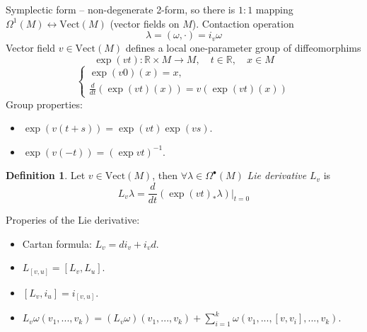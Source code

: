 \documentclass[12pt]{article}
\theoremstyle{definition}
\newtheorem{defin}{Definition}[]
\begin{document}
Symplectic form -- non-degenerate 2-form, so there is $1:1$ mapping $\Omega^1(M)\leftrightarrow\text{Vect}(M)$ (vector fields on $M$). Contaction operation
\begin{equation}
    \lambda=(\omega,\cdot)=i_v\omega
\end{equation}
Vector field $v\in\text{Vect}(M)$ defines a local one-parameter group of diffeomorphims
\begin{equation}
    \exp(vt):\mathbb{R}\times M\rightarrow M,\quad t\in\mathbb{R},\quad x\in M
\end{equation}
\begin{equation}
    \begin{cases}
        \exp(v0)(x)=x,\\
        \frac{d}{dt}(\exp(vt)(x))=v(\exp(vt)(x))
    \end{cases}
\end{equation}
Group properties:
\begin{itemize}
    \item $\exp(v(t+s))=\exp(vt)\exp(vs)$.
    \item $\exp(v(-t))=(\exp vt)^{-1}$.
\end{itemize}
\begin{defin}
    Let $v\in\text{Vect}(M)$, then $\forall\lambda\in\Omega^{\bullet}(M)$ \textit{Lie derivative} $L_v$ is
    \begin{equation}
        L_v\lambda=\frac{d}{dt}\left(\exp(vt)_*\lambda\right)|_{t=0}
    \end{equation}
\end{defin}
Properies of the Lie derivative:
\begin{itemize}
    \item Cartan formula: $L_v=di_v+i_vd$.
    \item $L_{[v,u]}=[L_v,L_u]$.
    \item $[L_v,i_u]=i_{[v,u]}$.
    \item $L_v\omega(v_1,...,v_k)=(L_v\omega)(v_1,...,v_k)+\sum\limits_{i=1}^k\omega(v_1,...,[v,v_i],...,v_k)$.
\end{itemize}
\end{document}
